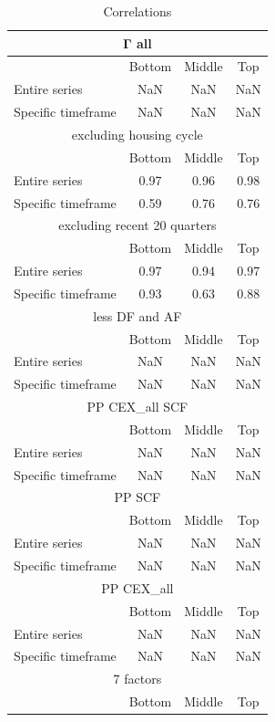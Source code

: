 \begin{table}[h!]
\centering
\caption{Correlations}
\begin{tabular}{|l|c|c|c|}
\hline
\multicolumn{4}{|c|}{Γ all} \\ \hline
& Bottom & Middle & Top \\ \hline
Entire series & NaN & NaN & NaN \\ \hline
Specific timeframe & NaN & NaN & NaN \\ \hline
\multicolumn{4}{|c|}{excluding housing cycle} \\ \hline
& Bottom & Middle & Top \\ \hline
Entire series & 0.97 & 0.96 & 0.98 \\ \hline
Specific timeframe & 0.59 & 0.76 & 0.76 \\ \hline
\multicolumn{4}{|c|}{excluding recent 20 quarters} \\ \hline
& Bottom & Middle & Top \\ \hline
Entire series & 0.97 & 0.94 & 0.97 \\ \hline
Specific timeframe & 0.93 & 0.63 & 0.88 \\ \hline
\multicolumn{4}{|c|}{less DF and AF} \\ \hline
& Bottom & Middle & Top \\ \hline
Entire series & NaN & NaN & NaN \\ \hline
Specific timeframe & NaN & NaN & NaN \\ \hline
\multicolumn{4}{|c|}{PP CEX_all SCF} \\ \hline
& Bottom & Middle & Top \\ \hline
Entire series & NaN & NaN & NaN \\ \hline
Specific timeframe & NaN & NaN & NaN \\ \hline
\multicolumn{4}{|c|}{PP SCF} \\ \hline
& Bottom & Middle & Top \\ \hline
Entire series & NaN & NaN & NaN \\ \hline
Specific timeframe & NaN & NaN & NaN \\ \hline
\multicolumn{4}{|c|}{PP CEX_all} \\ \hline
& Bottom & Middle & Top \\ \hline
Entire series & NaN & NaN & NaN \\ \hline
Specific timeframe & NaN & NaN & NaN \\ \hline
\multicolumn{4}{|c|}{7 factors} \\ \hline
& Bottom & Middle & Top \\ \hline

\end{tabular}
\end{table}
